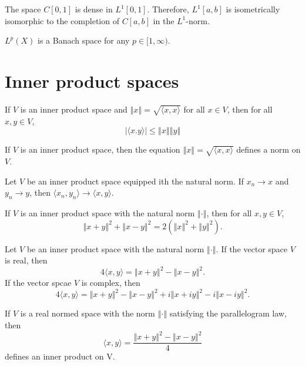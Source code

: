 \documentclass[a4paper]{article}
\newcommand{\norm}[1]{\left\Vert #1 \right\Vert}
\newcommand{\<}{\langle}
\renewcommand{\>}{\rangle}
\begin{document}
\begin{thm}
  The space $C[0,1]$ is dense in $L^1[0,1]$. Therefore, $L^1[a,b]$ is isometrically isomorphic to the completion of $C[a,b]$ in the $L^1$-norm.
\end{thm}

\begin{thm}
  $L^p(X)$ is a Banach space for any $p\in[1,\infty)$.
\end{thm}

\section{Inner product spaces}

\begin{lemma}
  If $V$ is an inner product space and $\norm{x}=\sqrt{\<x,x\>}$ for all $x\in V$, then for all $x,y\in V$,
  $$|\<x.y\>|\leq\norm{x}\norm{y}$$
\end{lemma}

\begin{prop}
  If $V$ is an inner product space, then the equation $\norm{x}=\sqrt{\<x,x\>}$ defines a norm on $V$.
\end{prop}

\begin{lemma}
  Let $V$ be an inner product space equipped ith the natural norm. If $x_n\to x$ and $y_n\to y$, then $\<x_n,y_n\>\to\<x,y\>$.
\end{lemma}

\begin{lemma}
  If $V$ is an inner product space with the natural norm $\norm{\cdot}$, then for all $x,y\in V$,
  $$\norm{x+y}^2+\norm{x-y}^2 = 2(\norm{x}^2+\norm{y}^2).$$
\end{lemma}

\begin{lemma}
  Let $V$ be an inner product space with the natural norm $\norm{\cdot}$. If the vector space $V$ is real, then
  $$ 4\<x,y\> = \norm{x+y}^2 - \norm{x-y}^2.$$
  If the vector spcae $V$ is complex, then
  $$ 4\<x,y\> = \norm{x+y}^2 - \norm{x-y}^2 + i\norm{x+i y}^2 - i\norm{x-i y}^2.$$
\end{lemma}

\begin{prop}
  If $V$ is a real normed space with the norm $\norm{\cdot}$ satisfying the parallelogram law, then
  $$\<x,y\> = \frac{\norm{x+y}^2 - \norm{x-y}^2}{4}$$
  defines an inner product on V.
\end{prop}
\end{document}
